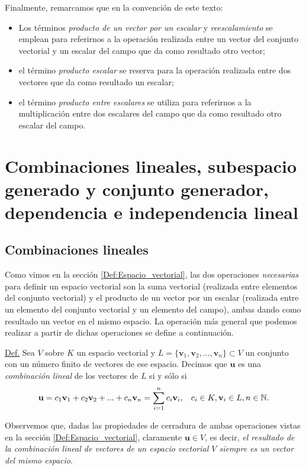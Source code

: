 \documentclass[12pt,dvipsnames]{article}
\begin{document}
\begin{tcolorbox}
\vspace{5mm}
\hspace{2.5mm} Finalmente, remarcamos que en la convención de este texto: 
    \begin{itemize}
        \item Los términos \emph{producto de un vector por un escalar} y \emph{reescalamiento} se emplean para referirnos a la operación realizada entre un vector del conjunto vectorial y un escalar del campo que da como resultado otro vector;
        \item el término \emph{producto escalar} se reserva para la operación realizada entre dos vectores que da como resultado un escalar;
        \item el término \emph{producto entre escalares} se utiliza para referirnos a la multiplicación entre dos escalares del campo que da como resultado otro escalar del campo.
    \end{itemize}





\end{tcolorbox}


\newpage
\section{Combinaciones lineales, subespacio generado y conjunto generador, dependencia e independencia lineal} \label{Sec:3}

\subsection{Combinaciones lineales} \label{Subsec:Combinaciones_lineales}

Como vimos en la sección \ref{Def:Espacio_vectorial}, las dos operaciones \emph{necesarias} para definir un espacio vectorial son la suma vectorial (realizada entre elementos del conjunto vectorial) y el producto de un vector por un escalar (realizada entre un elemento del conjunto vectorial y un elemento del campo), ambas dando como resultado un vector en el mismo espacio. La operación más general que podemos realizar a partir de dichas operaciones se define a continuación.

\begin{tcolorbox}
    \underline{Def.} Sea $V$ sobre $K$ un espacio vectorial y $L=\{\mathbf{v}_1, \mathbf{v}_2, ..., \mathbf{v}_n\}\subset V$ un conjunto con un número finito de vectores de ese espacio. Decimos que $\mathbf{u}$ es una \emph{combinación lineal} de los vectores de $L$ si y sólo si $$\mathbf{u} =c_1\mathbf{v}_1+c_2\mathbf{v}_2+...+c_n\mathbf{v}_n=\sum_{i=1}^n c_i\mathbf{v}_i,\hspace{3mm}c_i\in K, \mathbf{v}_i\in L, n\in \mathbb{N}.$$

    Observemos que, dadas las propiedades de cerradura de ambas operaciones vistas en la sección \ref{Def:Espacio_vectorial}, claramente $\mathbf{u} \in V$, es decir, \emph{el resultado de la combinación lineal de vectores de un espacio vectorial $V$ siempre es un vector del mismo espacio}. 
\end{tcolorbox}
\end{document}
